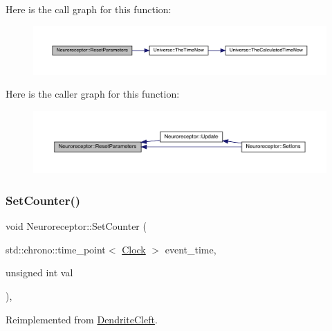 Here is the call graph for this function\+:\nopagebreak
\begin{figure}[H]
\begin{center}
\leavevmode
\includegraphics[width=350pt]{class_neuroreceptor_a30debeb0311d92eb6abe354409c15d09_cgraph}
\end{center}
\end{figure}
Here is the caller graph for this function\+:\nopagebreak
\begin{figure}[H]
\begin{center}
\leavevmode
\includegraphics[width=350pt]{class_neuroreceptor_a30debeb0311d92eb6abe354409c15d09_icgraph}
\end{center}
\end{figure}
\mbox{\label{class_neuroreceptor_a0660a316ef44cf723509f720acd16f24}} 
\subsubsection{\texorpdfstring{Set\+Counter()}{SetCounter()}}
{\footnotesize\ttfamily void Neuroreceptor\+::\+Set\+Counter (\begin{DoxyParamCaption}\item[{std\+::chrono\+::time\+\_\+point$<$ \hyperlink{universe_8h_a0ef8d951d1ca5ab3cfaf7ab4c7a6fd80}{Clock} $>$}]{event\+\_\+time,  }\item[{unsigned int}]{val }\end{DoxyParamCaption})\hspace{0.3cm}{\ttfamily [inline]}, {\ttfamily [virtual]}}



Reimplemented from \hyperlink{class_dendrite_cleft_a428b8e5117f381a382e0071b936d42a1}{Dendrite\+Cleft}.



